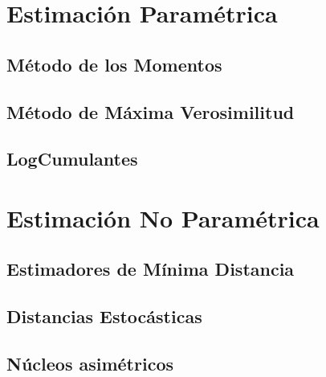 \section{Estimación Paramétrica}
\subsection{Método de los Momentos}
\subsection{Método de Máxima Verosimilitud}
\subsection{LogCumulantes}

\section{Estimación No Paramétrica}
\subsection{Estimadores de Mínima Distancia}
\subsection{Distancias Estocásticas}
\subsection{Núcleos asimétricos}

